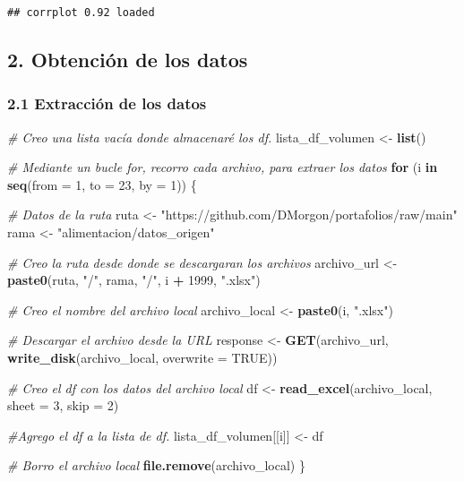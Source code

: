 \documentclass[
]{article}
\newenvironment{Shaded}{\begin{snugshade}}{\end{snugshade}}
\newcommand{\AttributeTok}[1]{\textcolor[rgb]{0.13,0.29,0.53}{#1}}
\newcommand{\CommentTok}[1]{\textcolor[rgb]{0.56,0.35,0.01}{\textit{#1}}}
\newcommand{\ConstantTok}[1]{\textcolor[rgb]{0.56,0.35,0.01}{#1}}
\newcommand{\ControlFlowTok}[1]{\textcolor[rgb]{0.13,0.29,0.53}{\textbf{#1}}}
\newcommand{\DecValTok}[1]{\textcolor[rgb]{0.00,0.00,0.81}{#1}}
\newcommand{\FunctionTok}[1]{\textcolor[rgb]{0.13,0.29,0.53}{\textbf{#1}}}
\newcommand{\NormalTok}[1]{#1}
\newcommand{\OtherTok}[1]{\textcolor[rgb]{0.56,0.35,0.01}{#1}}
\newcommand{\SpecialCharTok}[1]{\textcolor[rgb]{0.81,0.36,0.00}{\textbf{#1}}}
\newcommand{\StringTok}[1]{\textcolor[rgb]{0.31,0.60,0.02}{#1}}
\begin{document}
\begin{verbatim}
## corrplot 0.92 loaded
\end{verbatim}

\hypertarget{obtenciuxf3n-de-los-datos}{%
\subsection{2. Obtención de los datos}\label{obtenciuxf3n-de-los-datos}}

\hypertarget{extracciuxf3n-de-los-datos}{%
\subsubsection{2.1 Extracción de los
datos}\label{extracciuxf3n-de-los-datos}}

\begin{Shaded}
\begin{Highlighting}[]
\CommentTok{\# Creo una lista vacía donde almacenaré los df.}
\NormalTok{lista\_df\_volumen }\OtherTok{\textless{}{-}} \FunctionTok{list}\NormalTok{()}

\CommentTok{\# Mediante un bucle for, recorro cada archivo, para extraer los datos}
\ControlFlowTok{for}\NormalTok{ (i }\ControlFlowTok{in} \FunctionTok{seq}\NormalTok{(}\AttributeTok{from =} \DecValTok{1}\NormalTok{, }\AttributeTok{to =} \DecValTok{23}\NormalTok{, }\AttributeTok{by =} \DecValTok{1}\NormalTok{)) \{}
  
  \CommentTok{\# Datos de la ruta}
\NormalTok{  ruta }\OtherTok{\textless{}{-}} \StringTok{"https://github.com/DMorgon/portafolios/raw/main"}
\NormalTok{  rama }\OtherTok{\textless{}{-}} \StringTok{"alimentacion/datos\_origen"}

  \CommentTok{\# Creo la ruta desde donde se descargaran los archivos}
\NormalTok{  archivo\_url }\OtherTok{\textless{}{-}} \FunctionTok{paste0}\NormalTok{(ruta, }\StringTok{"/"}\NormalTok{, rama, }\StringTok{"/"}\NormalTok{, i }\SpecialCharTok{+} \DecValTok{1999}\NormalTok{, }\StringTok{".xlsx"}\NormalTok{)}
  
  \CommentTok{\# Creo el nombre del archivo local}
\NormalTok{  archivo\_local }\OtherTok{\textless{}{-}} \FunctionTok{paste0}\NormalTok{(i, }\StringTok{".xlsx"}\NormalTok{)}
  
  \CommentTok{\# Descargar el archivo desde la URL}
\NormalTok{  response }\OtherTok{\textless{}{-}} \FunctionTok{GET}\NormalTok{(archivo\_url, }\FunctionTok{write\_disk}\NormalTok{(archivo\_local, }\AttributeTok{overwrite =} \ConstantTok{TRUE}\NormalTok{))}
  
  \CommentTok{\# Creo el df con los datos del archivo local}
\NormalTok{  df }\OtherTok{\textless{}{-}} \FunctionTok{read\_excel}\NormalTok{(archivo\_local, }\AttributeTok{sheet =} \DecValTok{3}\NormalTok{, }\AttributeTok{skip =} \DecValTok{2}\NormalTok{)}
  
  \CommentTok{\#Agrego el df a la lista de df.}
\NormalTok{  lista\_df\_volumen[[i]] }\OtherTok{\textless{}{-}}\NormalTok{ df}
  
  \CommentTok{\# Borro el archivo local}
  \FunctionTok{file.remove}\NormalTok{(archivo\_local)}
\NormalTok{\}}
\end{Highlighting}
\end{Shaded}
\end{document}
